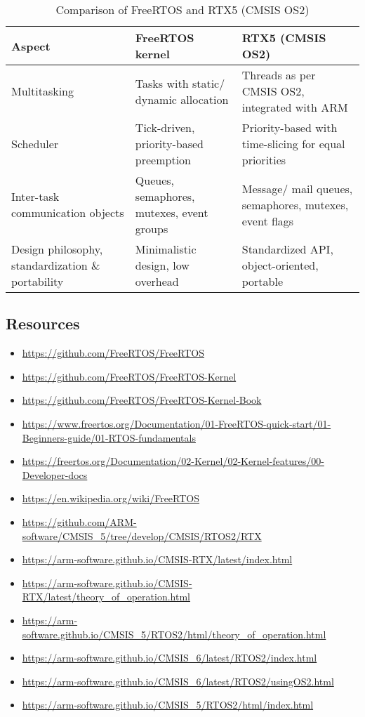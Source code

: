 \begin{table}[htbp]
    \centering
    \begin{tabular}{p{3.6cm} p{6cm} p{6cm}}
        \toprule
        \textbf{Aspect}
         &
        \textbf{FreeRTOS kernel}
         &
        \textbf{RTX5 (CMSIS OS2)}
        \\ \midrule
        Multitasking
         &
        Tasks with static/ dynamic allocation
         &
        Threads as per CMSIS OS2, integrated with ARM
        \\ \midrule
        Scheduler
         &
        Tick-driven, priority-based preemption
         &
        Priority-based with time-slicing for equal priorities
        \\ \midrule
        Inter-task communication objects
         &
        Queues, semaphores, mutexes, event groups
         &
        Message/ mail queues, semaphores, mutexes, event flags
        \\ \midrule
        Design philosophy, standardization \& portability
         &
        Minimalistic design, low overhead
         &
        Standardized API, object-oriented, portable
        \\ \bottomrule
    \end{tabular}
    \caption{
        Comparison of FreeRTOS and RTX5 (CMSIS OS2)
    }\label{tab:comparison}
\end{table}

\newpage
\subsection*{Resources}

\begin{itemize}[noitemsep, leftmargin=*]
    \item \url{https://github.com/FreeRTOS/FreeRTOS}
    \item \url{https://github.com/FreeRTOS/FreeRTOS-Kernel}
    \item \url{https://github.com/FreeRTOS/FreeRTOS-Kernel-Book}
    \item \url{https://www.freertos.org/Documentation/01-FreeRTOS-quick-start/01-Beginners-guide/01-RTOS-fundamentals}
    \item \url{https://freertos.org/Documentation/02-Kernel/02-Kernel-features/00-Developer-docs}
    \item \url{https://en.wikipedia.org/wiki/FreeRTOS}
    \item \url{https://github.com/ARM-software/CMSIS_5/tree/develop/CMSIS/RTOS2/RTX}
    \item \url{https://arm-software.github.io/CMSIS-RTX/latest/index.html}
    \item \url{https://arm-software.github.io/CMSIS-RTX/latest/theory_of_operation.html}
    \item \url{https://arm-software.github.io/CMSIS_5/RTOS2/html/theory_of_operation.html}
    \item \url{https://arm-software.github.io/CMSIS_6/latest/RTOS2/index.html}
    \item \url{https://arm-software.github.io/CMSIS_6/latest/RTOS2/usingOS2.html}
    \item \url{https://arm-software.github.io/CMSIS_5/RTOS2/html/index.html}
\end{itemize}
